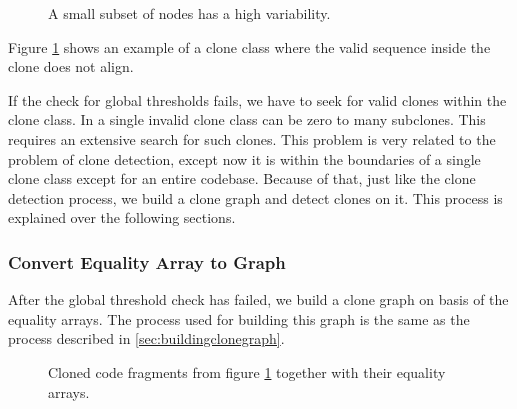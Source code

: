 \begin{figure}[H]
\begin{parcolumns}{3}
\end{parcolumns}
\caption{A small subset of nodes has a high variability.}
\label{fig:2rvariabilityhigh3}
\end{figure}

Figure \ref{fig:2rvariabilityhigh3} shows an example of a clone class where the valid sequence inside the clone does not align.

If the check for global thresholds fails, we have to seek for valid clones within the clone class. In a single invalid clone class can be zero to many subclones. This requires an extensive search for such clones. This problem is very related to the problem of clone detection, except now it is within the boundaries of a single clone class except for an entire codebase. Because of that, just like the clone detection process, we build a clone graph and detect clones on it. This process is explained over the following sections.

\subsubsection{Convert Equality Array to Graph}
After the global threshold check has failed, we build a clone graph on basis of the equality arrays. The process used for building this graph is the same as the process described in \ref{sec:buildingclonegraph}.

\begin{figure}[H]
\begin{parcolumns}{3}
\end{parcolumns}
\caption{Cloned code fragments from figure \ref{fig:2rvariabilityhigh3} together with their equality arrays.}
\label{fig:2rvariabilityhigh4}
\end{figure}

